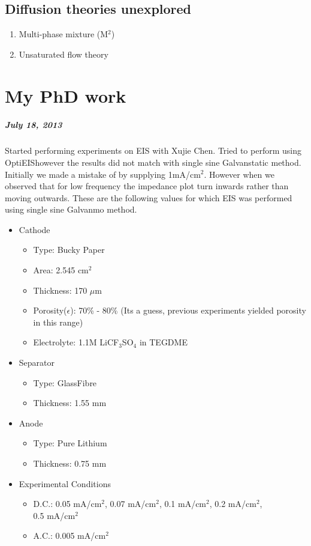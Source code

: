 \documentclass[12pt]{book}
\begin{document}
\section{Diffusion theories  unexplored}
\begin{enumerate}
\item Multi-phase mixture (M$^2$)
\item Unsaturated flow theory
\end{enumerate}

\chapter{My PhD work}
\paragraph{July 18, 2013}
 Started performing experiments on EIS with Xujie Chen. Tried to perform using OptiEIS\texttrademark however the results did not match with single sine Galvanstatic method. 
 Initially we made a mistake of by supplying 1mA/cm$^2$. However when we observed that for low frequency the impedance plot turn inwards rather than moving outwards.
 These are the following values for which EIS was performed using single sine Galvanmo method.
\begin{itemize}
\item Cathode
\begin{itemize}
\item Type: Bucky Paper
\item Area: 2.545 cm$^2$ 
\item Thickness: 170 $\mu$m
\item Porosity($\epsilon$): 70\% - 80\% (Its a guess, previous experiments yielded porosity in this range)
\item Electrolyte: 1.1M LiCF$_3$SO$_4$ in TEGDME
\end{itemize}
\item Separator
\begin{itemize}
\item Type: GlassFibre
\item Thickness: 1.55 mm 
\end{itemize}
\item Anode
\begin{itemize}
\item Type: Pure Lithium
\item Thickness: 0.75 mm
\end{itemize}
\item Experimental Conditions
\begin{itemize}
\item D.C.: 0.05 mA/cm$^2$, 0.07 mA/cm$^2$, 0.1 mA/cm$^2$, 0.2 mA/cm$^2$, \\0.5 mA/cm$^2$
\item A.C.: 0.005 mA/cm$^2$ 
\end{itemize}
\end{itemize}
\end{document}
